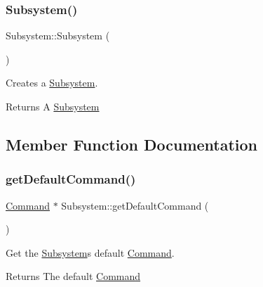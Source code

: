 \subsubsection{\texorpdfstring{Subsystem()}{Subsystem()}}
{\footnotesize\ttfamily Subsystem\+::\+Subsystem (\begin{DoxyParamCaption}{ }\end{DoxyParamCaption})}



Creates a \mbox{\hyperlink{classlib_iterative_robot_1_1_subsystem}{Subsystem}}. 

\begin{DoxyReturn}{Returns}
A \mbox{\hyperlink{classlib_iterative_robot_1_1_subsystem}{Subsystem}} 
\end{DoxyReturn}


\subsection{Member Function Documentation}
\mbox{\label{classlib_iterative_robot_1_1_subsystem_a7e0c4904d9ff8ad2e4b6bc98d0f9579f}} 
\subsubsection{\texorpdfstring{getDefaultCommand()}{getDefaultCommand()}}
{\footnotesize\ttfamily \mbox{\hyperlink{classlib_iterative_robot_1_1_command}{Command}} $\ast$ Subsystem\+::get\+Default\+Command (\begin{DoxyParamCaption}{ }\end{DoxyParamCaption})\hspace{0.3cm}{\ttfamily [protected]}}



Get the \mbox{\hyperlink{classlib_iterative_robot_1_1_subsystem}{Subsystem}}\textquotesingle{}s default \mbox{\hyperlink{classlib_iterative_robot_1_1_command}{Command}}. 

\begin{DoxyReturn}{Returns}
The default \mbox{\hyperlink{classlib_iterative_robot_1_1_command}{Command}} 
\end{DoxyReturn}
\mbox{\label{classlib_iterative_robot_1_1_subsystem_a6fff5c5756245ac750c2b26ee0ed2be7}} 
